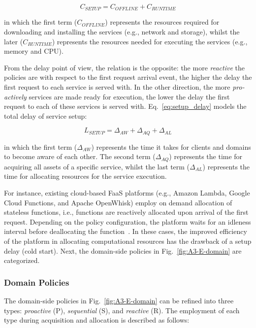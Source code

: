 \begin{equation}\label{eq:setup_cost}
C_{SETUP} = C_{OFFLINE} + C_{RUNTIME}
\end{equation}

\noindent
in which the first term ($C_{OFFLINE}$) represents the resources required for downloading and installing the services (e.g., network and storage), whilst the later ($C_{RUNTIME}$) represents the resources needed for executing the services (e.g., memory and CPU). 

From the delay point of view, the relation is the opposite: the more \textit{reactive} the policies are with respect to the first request arrival event, the higher the delay the first request to each service is served with. In the other direction, the more \textit{pro-actively} services are made ready for execution, the lower the delay the first request to each of these services is served with. Eq.~\ref{eq:setup_delay} models the total delay of service setup:

\begin{equation}\label{eq:setup_delay}
L_{SETUP} = \Delta_{AW} + \Delta_{AQ} + \Delta_{AL}
\end{equation}

\noindent
in which the first term ($\Delta_{AW}$) represents the time it takes for clients and domains to become aware of each other. The second term ($\Delta_{AQ}$) represents the time for acquiring all assets of a specific service, whilst the last term ($\Delta_{AL}$) represents the time for allocating resources for the service execution. 

For instance, existing cloud-based FaaS platforms (e.g., Amazon Lambda, Google Cloud Functions, and Apache OpenWhisk) employ on demand allocation of stateless functions, i.e., functions are reactively allocated upon arrival of the first request. Depending on the policy configuration, the platform waits for an idleness interval before deallocating the function~\cite{}. In these cases, the improved efficiency of the platform in allocating computational resources has the drawback of a setup delay (cold start). Next, the domain-side policies in Fig.~\ref{fig:A3-E-domain} are categorized.

\subsubsection*{Domain Policies} The domain-side policies in Fig.~\ref{fig:A3-E-domain} can be refined into three types: \textit{proactive} (P), \textit{sequential} (S), and \textit{reactive} (R). The employment of each type during acquisition and allocation is described as follows:

